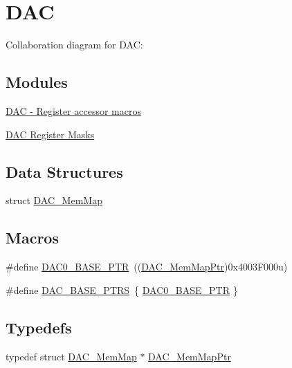 \hypertarget{group___d_a_c___peripheral}{}\section{D\+AC}
\label{group___d_a_c___peripheral}
Collaboration diagram for D\+AC\+:
\subsection*{Modules}
\begin{DoxyCompactItemize}
\item 
\hyperlink{group___d_a_c___register___accessor___macros}{D\+A\+C -\/ Register accessor macros}
\item 
\hyperlink{group___d_a_c___register___masks}{D\+A\+C Register Masks}
\end{DoxyCompactItemize}
\subsection*{Data Structures}
\begin{DoxyCompactItemize}
\item 
struct \hyperlink{struct_d_a_c___mem_map}{D\+A\+C\+\_\+\+Mem\+Map}
\end{DoxyCompactItemize}
\subsection*{Macros}
\begin{DoxyCompactItemize}
\item 
\#define \hyperlink{group___d_a_c___peripheral_gabe3b30df06ec04e5c899efd6e49f1800}{D\+A\+C0\+\_\+\+B\+A\+S\+E\+\_\+\+P\+TR}~((\hyperlink{group___d_a_c___peripheral_gaf4fffbe25ce148c577ec740897223a7f}{D\+A\+C\+\_\+\+Mem\+Map\+Ptr})0x4003\+F000u)
\item 
\#define \hyperlink{group___d_a_c___peripheral_gab47690040e4d63adc4f324358c27157a}{D\+A\+C\+\_\+\+B\+A\+S\+E\+\_\+\+P\+T\+RS}~\{ \hyperlink{group___d_a_c___peripheral_gabe3b30df06ec04e5c899efd6e49f1800}{D\+A\+C0\+\_\+\+B\+A\+S\+E\+\_\+\+P\+TR} \}
\end{DoxyCompactItemize}
\subsection*{Typedefs}
\begin{DoxyCompactItemize}
\item 
typedef struct \hyperlink{struct_d_a_c___mem_map}{D\+A\+C\+\_\+\+Mem\+Map} $\ast$ \hyperlink{group___d_a_c___peripheral_gaf4fffbe25ce148c577ec740897223a7f}{D\+A\+C\+\_\+\+Mem\+Map\+Ptr}
\end{DoxyCompactItemize}


